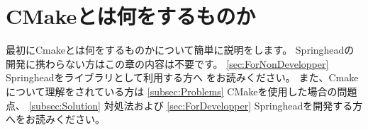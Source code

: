 \newpage
\section{CMakeとは何をするものか}
\label{sec:WhatCMakeWillDo}

\noindent
最初にCmakeとは何をするものかについて簡単に説明をします。
Springheadの開発に携わらない方はこの章の内容は不要です。
\UpKQs \ref{sec:ForNonDevelopper} Springheadをライブラリとして利用する方へ\UpKQe
をお読みください。
また、Cmakeについて理解をされている方は
\UpKQs \ref{subsec:Problems} CMakeを使用した場合の問題点\UpKQe、
\UpKQs \ref{subsec:Solution} 対処法\UpKQe および
\UpKQs \ref{sec:ForDevelopper} Springheadを開発する方へ\UpKQe をお読みください。

